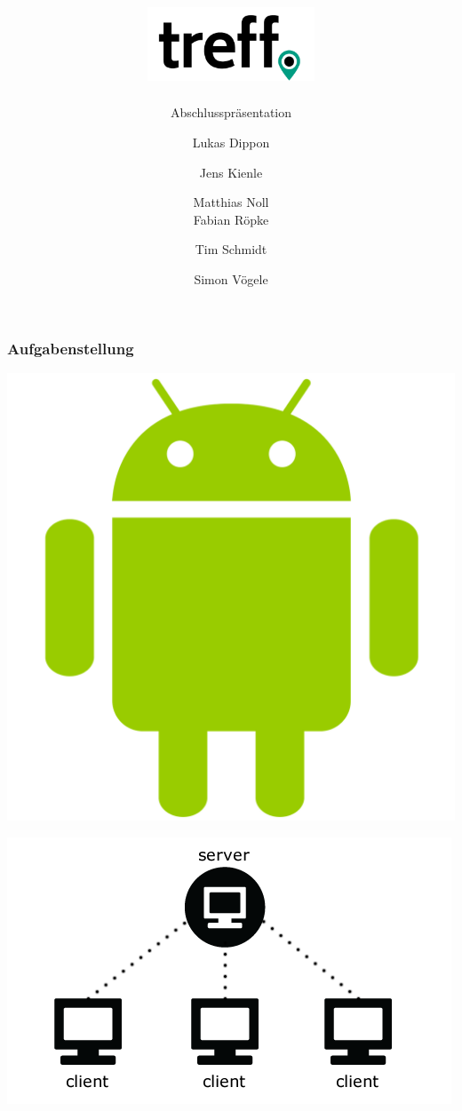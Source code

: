 \documentclass[aspectratio=1610]{beamer}
\title{\includegraphics[width = 50mm]{images/logo_crop.png}}
\subtitle{\huge Abschlusspräsentation}
\author{Lukas Dippon
	\and Jens Kienle
	\and Matthias Noll
    \\Fabian Röpke
	\and Tim Schmidt
	\and Simon Vögele}
\begin{document}
	\begin{frame}[plain]
	\maketitle
	\end{frame}

    \begin{frame}[plain]
        \frametitle{\textbf{Aufgabenstellung}}
        \begin{minipage}{0.45\textwidth}
            \includegraphics[width = \columnwidth - 30pt]{images/android.png}
        \end{minipage}
        \begin{minipage}{0.45\textwidth}
            \includegraphics[width = \columnwidth - 30pt]
            {images/server-client.png}
        \end{minipage}
    \end{frame}
\end{document}
